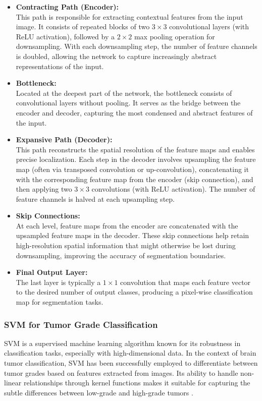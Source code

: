 \begin{itemize}
  \item \textbf{Contracting Path (Encoder):} \\
        This path is responsible for extracting contextual features from the input image. It consists of repeated blocks of two $3\times3$ convolutional layers (with ReLU activation), followed by a $2\times2$ max pooling operation for downsampling. With each downsampling step, the number of feature channels is doubled, allowing the network to capture increasingly abstract representations of the input.

  \item \textbf{Bottleneck:} \\
        Located at the deepest part of the network, the bottleneck consists of convolutional layers without pooling. It serves as the bridge between the encoder and decoder, capturing the most condensed and abstract features of the input.

  \item \textbf{Expansive Path (Decoder):} \\
        This path reconstructs the spatial resolution of the feature maps and enables precise localization. Each step in the decoder involves upsampling the feature map (often via transposed convolution or up-convolution), concatenating it with the corresponding feature map from the encoder (skip connection), and then applying two $3\times3$ convolutions (with ReLU activation). The number of feature channels is halved at each upsampling step.

  \item \textbf{Skip Connections:} \\
        At each level, feature maps from the encoder are concatenated with the upsampled feature maps in the decoder. These skip connections help retain high-resolution spatial information that might otherwise be lost during downsampling, improving the accuracy of segmentation boundaries.

  \item \textbf{Final Output Layer:} \\
        The last layer is typically a $1\times1$ convolution that maps each feature vector to the desired number of output classes, producing a pixel-wise classification map for segmentation tasks.
\end{itemize}

\subsubsection{SVM for Tumor Grade Classification}
SVM is a supervised machine learning algorithm known for its robustness in classification tasks, especially with high-dimensional data. In the context of brain tumor classification, SVM has been successfully employed to differentiate between tumor grades based on features extracted from  images. Its ability to handle non-linear relationships through kernel functions makes it suitable for capturing the subtle differences between low-grade and high-grade tumors \cite{turk2022machine, barker2016automated}.

